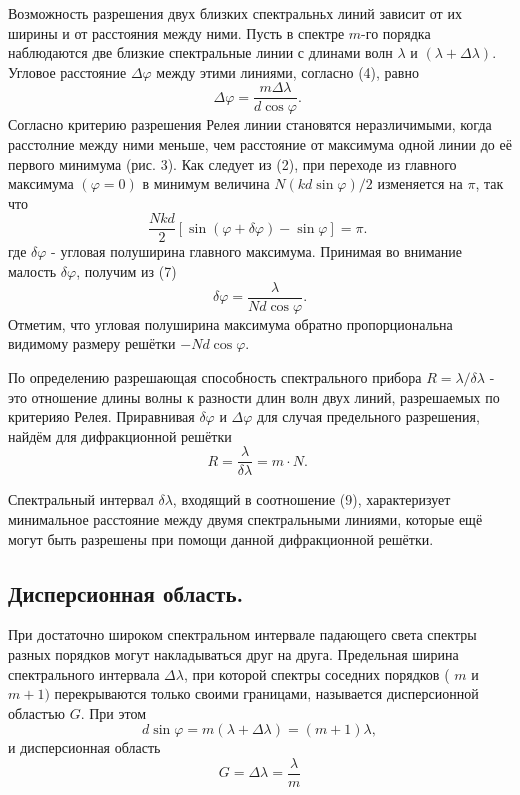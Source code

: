 \documentclass[a4paper, 12pt]{article}
\begin{document}
Возможность разрешения двух близких спектральньх линий зависит от их ширины и от расстояния между ними.
Пусть в спектре $m$-го порядка наблюдаются две близкие спектральные линии с длинами волн $\lambda$ и $(\lambda+\Delta \lambda)$. Угловое расстояние $\Delta \varphi$ между этими линиями, согласно (4), равно
\begin{equation}
	\Delta \varphi=\frac{m \Delta \lambda}{d \cos \varphi} \text {. }
\end{equation}
Согласно критерию разрешения Релея линии становятся неразличимыми, когда расстолние между ними меньше, чем расстояние от максимума одной линии до её первого минимума (рис. 3). Как следует из (2), при переходе из главного максимума $(\varphi=0)$ в минимум величина $N(k d \sin \varphi) / 2$ изменяется на $\pi$, так что
\begin{equation}
	\frac{N k d}{2}[\sin (\varphi+\delta \varphi)-\sin \varphi]=\pi \text {. }
\end{equation}
где $\delta \varphi$ - угловая полуширина главного максимума. Принимая во внимание малость $\delta \varphi$, получим из (7)
\begin{equation}
\delta \varphi=\frac{\lambda}{N d \cos \varphi} .
\end{equation}
Отметим, что угловая полуширина максимума обратно пропорциональна видимому размеру решётки $-N d \cos \varphi$.

По определению разрешающая способность спектрального прибора $R=\lambda / \delta \lambda$ - это отношение длины волны к разности длин волн двух линий, разрешаемых по критерияо Релея. Приравнивая $\delta \varphi$ и $\Delta \varphi$ для случая предельного разрешения, найдём для дифракционной решётки
\begin{equation}
R=\frac{\lambda}{\delta \lambda}=m \cdot N \text {. }
\end{equation}

Спектральный интервал $\delta \lambda$, входящий в соотношение (9), характеризует минимальное расстояние между двумя спектральными линиями, которые ещё могут быть разрешены при помощи данной дифракционной решётки.

\subsection*{Дисперсионная область.}
При достаточно широком спектральном интервале падающего света спектры разных порядков могут накладываться друг на друга. Предельная ширина спектрального интервала $\Delta \lambda$, при которой спектры соседних порядков ( $m$ и $m+1)$ перекрываются только своими границами, называется дисперсионной областъю $G$. При этом
\begin{equation}
d \sin \varphi=m(\lambda+\Delta \lambda)=(m+1) \lambda,
\end{equation}
и дисперсионная область
\begin{equation}
	G=\Delta \lambda=\frac{\lambda}{m}
\end{equation}
\end{document}
